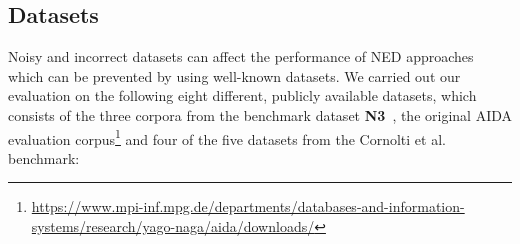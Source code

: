 
\subsection{Datasets}
Noisy and incorrect datasets can affect the performance of \ac{NED} approaches which can be prevented by using well-known datasets.
We carried out our evaluation on the following eight different, publicly available datasets, which consists of the three corpora from the benchmark dataset \textbf{N3}~\cite{n3}, the original AIDA evaluation corpus\footnote{\url{https://www.mpi-inf.mpg.de/departments/databases-and-information-systems/research/yago-naga/aida/downloads/}} and four of the five datasets from the Cornolti et al.~\cite{cornolti} benchmark:

